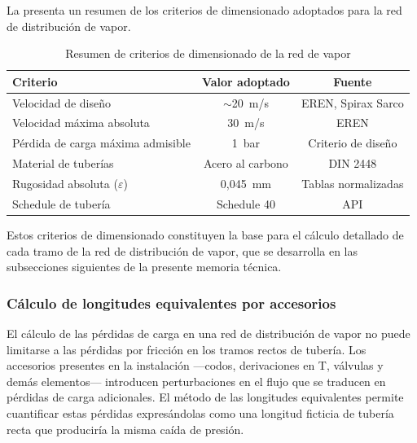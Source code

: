 \documentclass[12pt]{article}
\begin{document}
La  presenta un resumen de los criterios de dimensionado adoptados para la red de distribución de vapor.

\begin{table}[H]
	\centering
	\caption{Resumen de criterios de dimensionado de la red de vapor}
	\label{tab:resumen-criterios-dimensionado}
	\begin{tabular}{lcc}
		\toprule
		\textbf{Criterio}                  & \textbf{Valor adoptado} & \textbf{Fuente}     \\
		\midrule
		Velocidad de diseño                & $\sim$20~m/s            & EREN, Spirax Sarco  \\
		Velocidad máxima absoluta          & 30~m/s                  & EREN                \\
		Pérdida de carga máxima admisible  & 1~bar                   & Criterio de diseño  \\
		Material de tuberías               & Acero al carbono        & DIN 2448            \\
		Rugosidad absoluta ($\varepsilon$) & 0,045~mm                & Tablas normalizadas \\
		Schedule de tubería                & Schedule 40             & API                 \\
		\bottomrule
	\end{tabular}
\end{table}

Estos criterios de dimensionado constituyen la base para el cálculo detallado de cada tramo de la red de distribución de vapor, que se desarrolla en las subsecciones siguientes de la presente memoria técnica.

\subsubsection{Cálculo de longitudes equivalentes por accesorios}
\label{subsubsec:longitudes-equivalentes-accesorios}

El cálculo de las pérdidas de carga en una red de distribución de vapor no puede limitarse a las pérdidas por fricción en los tramos rectos de tubería. Los accesorios presentes en la instalación ---codos, derivaciones en T, válvulas y demás elementos--- introducen perturbaciones en el flujo que se traducen en pérdidas de carga adicionales. El método de las longitudes equivalentes permite cuantificar estas pérdidas expresándolas como una longitud ficticia de tubería recta que produciría la misma caída de presión.
\end{document}
